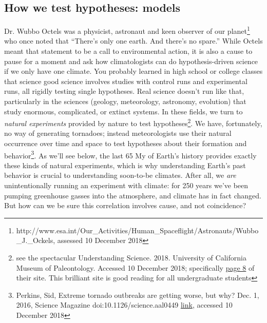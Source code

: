 \subsection{How we test hypotheses: models}
Dr. Wubbo Octels was a physicist, astronaut and keen observer of our planet\footnote{http://www.esa.int/Our\_Activities/Human\_Spaceflight/Astronauts/Wubbo\_J.\_Ockels, assessed 10 December 2018} who once noted that ``There's only one earth. And there's no spare.'' While Octels meant that statement to be a call to environmental action, it is also a cause to pause for a moment and ask how climatologists can do hypothesis-driven science if we only have one climate. You probably learned in high school or college classes that science good science involves studies with control runs and experimental runs, all rigidly testing single hypotheses. Real science doesn't run like that, particularly in the sciences (geology, meteorology, astronomy, evolution) that study enormous, complicated, or extinct systems. In these fields, we turn to \emph{natural experiments} provided by nature to test hypotheses\footnote{see the spectacular Understanding Science. 2018. University of California Museum of Paleontology. Accessed 10 December 2018; specifically \href{https://undsci.berkeley.edu/article/0_0_0/howscienceworks_08}{page 8} of their site. This brilliant site is good reading for all undergraduate students}. We have, fortunately, no way of generating tornadoes; instead meteorologists use their natural occurrence over time and space to test hypotheses about their formation and behavior\footnote{Perkins, Sid, Extreme tornado outbreaks are getting worse, but why? Dec. 1, 2016, Science Magazine doi:10.1126/science.aal0449 \href{https://www.sciencemag.org/news/2016/12/extreme-tornado-outbreaks-are-getting-worse-why}{link}, accessed 10 December 2018}. As we'll see below, the last 65 My of Earth's history provides exactly these kinds of natural experiments, which is why understanding Earth's past behavior is crucial to understanding soon-to-be climates. After all, we \emph{are} unintentionally running an experiment with climate: for 250 years we've been pumping greenhouse gasses into the atmosphere, and climate has in fact changed. But how can we be sure this correlation involves cause, and not coincidence?\\

